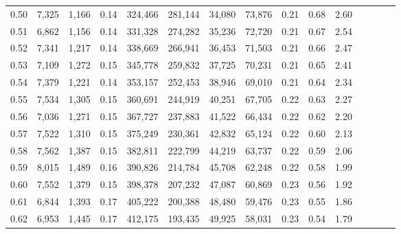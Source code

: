 \begin{tabular}{rrrcrrrrrrrrrrr}
0.50 &   7,325 &   1,166 &                                       0.14 &  324,466 &  281,144 &   34,080 &   73,876 &  0.21 &  0.68 &                         2.60 \\
0.51 &   6,862 &   1,156 &                                       0.14 &  331,328 &  274,282 &   35,236 &   72,720 &  0.21 &  0.67 &                         2.54 \\
0.52 &   7,341 &   1,217 &                                       0.14 &  338,669 &  266,941 &   36,453 &   71,503 &  0.21 &  0.66 &                         2.47 \\
0.53 &   7,109 &   1,272 &                                       0.15 &  345,778 &  259,832 &   37,725 &   70,231 &  0.21 &  0.65 &                         2.41 \\
0.54 &   7,379 &   1,221 &                                       0.14 &  353,157 &  252,453 &   38,946 &   69,010 &  0.21 &  0.64 &                         2.34 \\
0.55 &   7,534 &   1,305 &                                       0.15 &  360,691 &  244,919 &   40,251 &   67,705 &  0.22 &  0.63 &                         2.27 \\
0.56 &   7,036 &   1,271 &                                       0.15 &  367,727 &  237,883 &   41,522 &   66,434 &  0.22 &  0.62 &                         2.20 \\
0.57 &   7,522 &   1,310 &                                       0.15 &  375,249 &  230,361 &   42,832 &   65,124 &  0.22 &  0.60 &                         2.13 \\
0.58 &   7,562 &   1,387 &                                       0.15 &  382,811 &  222,799 &   44,219 &   63,737 &  0.22 &  0.59 &                         2.06 \\
0.59 &   8,015 &   1,489 &                                       0.16 &  390,826 &  214,784 &   45,708 &   62,248 &  0.22 &  0.58 &                         1.99 \\
0.60 &   7,552 &   1,379 &                                       0.15 &  398,378 &  207,232 &   47,087 &   60,869 &  0.23 &  0.56 &                         1.92 \\
0.61 &   6,844 &   1,393 &                                       0.17 &  405,222 &  200,388 &   48,480 &   59,476 &  0.23 &  0.55 &                         1.86 \\
0.62 &   6,953 &   1,445 &                                       0.17 &  412,175 &  193,435 &   49,925 &   58,031 &  0.23 &  0.54 &                         1.79 \\

\end{tabular}
